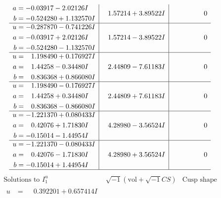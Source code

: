 \documentclass[1p]{elsarticle_modified}
\theoremstyle{definition}
\newcommand{\I}{\sqrt{-1}}
\begin{document}
$$\begin{array}{c|c|c}
\begin{aligned}
a &= -0.03917 - 2.02126 I \\
b &= -0.524280 + 1.132570 I\end{aligned}
 & \phantom{-}1.57214 + 3.89522 I & \phantom{-0.000000 } 0 \\ \hline\begin{aligned}
u &= -0.287870 - 0.741226 I \\
a &= -0.03917 + 2.02126 I \\
b &= -0.524280 - 1.132570 I\end{aligned}
 & \phantom{-}1.57214 - 3.89522 I & \phantom{-0.000000 } 0 \\ \hline\begin{aligned}
u &= \phantom{-}1.198490 + 0.176927 I \\
a &= \phantom{-}1.44258 - 0.34480 I \\
b &= \phantom{-}0.836368 + 0.866080 I\end{aligned}
 & \phantom{-}2.44809 - 7.61183 I & \phantom{-0.000000 } 0 \\ \hline\begin{aligned}
u &= \phantom{-}1.198490 - 0.176927 I \\
a &= \phantom{-}1.44258 + 0.34480 I \\
b &= \phantom{-}0.836368 - 0.866080 I\end{aligned}
 & \phantom{-}2.44809 + 7.61183 I & \phantom{-0.000000 } 0 \\ \hline\begin{aligned}
u &= -1.221370 + 0.080433 I \\
a &= \phantom{-}0.42076 + 1.71830 I \\
b &= -0.15014 - 1.44954 I\end{aligned}
 & \phantom{-}4.28980 - 3.56524 I & \phantom{-0.000000 } 0 \\ \hline\begin{aligned}
u &= -1.221370 - 0.080433 I \\
a &= \phantom{-}0.42076 - 1.71830 I \\
b &= -0.15014 + 1.44954 I\end{aligned}
 & \phantom{-}4.28980 + 3.56524 I & \phantom{-0.000000 } 0\\
 \hline 
 \end{array}$$\newpage$$\begin{array}{c|c|c}  
\text{Solutions to }I^u_{1}& \I (\text{vol} + \sqrt{-1}CS) & \text{Cusp shape}\\
 \hline 
\begin{aligned}
u &= \phantom{-}0.392201 + 0.657414 I \\

\end{aligned}
\end{array}$$
\end{document}
